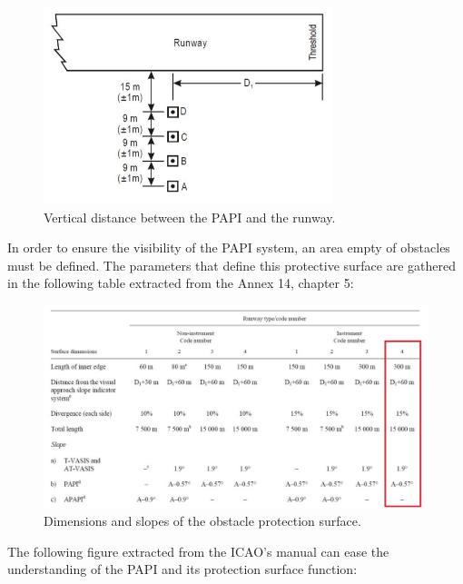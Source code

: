 		 \begin{figure}[H]
		 	\centering
		 	\includegraphics[clip, trim=0cm 0cm 0cm 0cm, width=0.75\textwidth]{./images/Annex14/PAPI}
		 	\caption{Vertical distance between the PAPI and the runway.} %
		 	\label{} %
		 \end{figure}
		
		In order to ensure the visibility of the PAPI system, an area empty of obstacles must be defined. The parameters that define this protective surface are gathered in the following table extracted from the Annex 14, chapter 5:
		
		\begin{figure}[H]
			\centering
			\includegraphics[clip, trim=0cm 0cm 0cm 0cm, width=1\textwidth]{./images/Annex14/SuperficiesPAPI}
			\caption{Dimensions and slopes of the obstacle protection surface.} %
			\label{} %
		\end{figure}
		
		The following figure extracted from the ICAO's manual can ease the understanding of the PAPI and its protection surface function:
		
